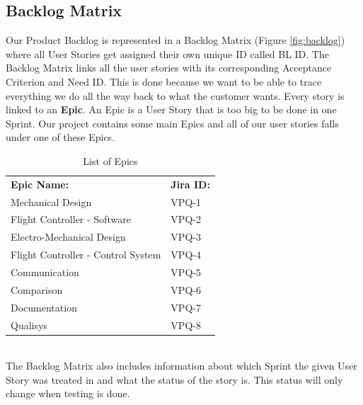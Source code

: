 \subsection{Backlog Matrix}
Our Product Backlog is represented in a Backlog Matrix (Figure \ref{fig:backlog}) where all User Stories get assigned their own unique ID called BL ID. The Backlog Matrix links all the user stories with its corresponding Acceptance Criterion and Need ID. This is done because we want to be able to trace everything we do all the way back to what the customer wants. Every story is linked to an \textbf{Epic}. An Epic is a User Story that is too big to be done in one Sprint. Our project contains some main Epics and all of our user stories falls under one of these Epics. 

\begin{table}[h]
\begin{center}
\caption{List of Epics}
\begin{tabular}{l|l}
     \rowcolor{cadetgrey} \textbf{Epic Name:}      & \textbf{Jira ID:} \\
                        Mechanical Design                       & VPQ-1 \\  
\rowcolor{gainsboro}    Flight Controller - Software            & VPQ-2 \\  
                        Electro-Mechanical Design               & VPQ-3 \\  
\rowcolor{gainsboro}    Flight Controller - Control System      & VPQ-4 \\  
                        Communication                           & VPQ-5 \\  
\rowcolor{gainsboro}    Comparison                              & VPQ-6 \\  
                        Documentation                           & VPQ-7 \\  
\rowcolor{gainsboro}    Qualisys                                & VPQ-8 \\ 
                           
\end{tabular}
\end{center}
\end{table}
\\ 
\noindent The Backlog Matrix also includes information about which Sprint the given User Story was treated in and what the status of the story is. This status will only change when testing is done.  

